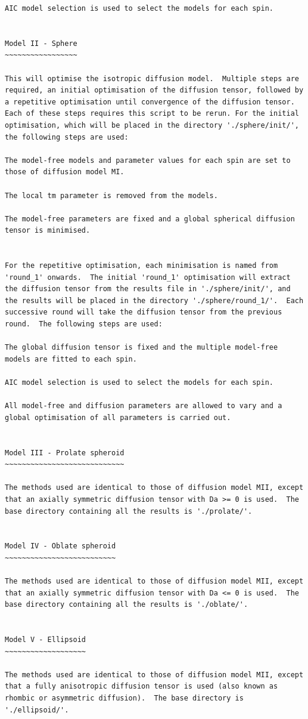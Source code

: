 \begin{lstlisting}
AIC model selection is used to select the models for each spin.


Model II - Sphere
~~~~~~~~~~~~~~~~~

This will optimise the isotropic diffusion model.  Multiple steps are required, an initial optimisation of the diffusion tensor, followed by a repetitive optimisation until convergence of the diffusion tensor.  Each of these steps requires this script to be rerun. For the initial optimisation, which will be placed in the directory './sphere/init/', the following steps are used:

The model-free models and parameter values for each spin are set to those of diffusion model MI.

The local tm parameter is removed from the models.

The model-free parameters are fixed and a global spherical diffusion tensor is minimised.


For the repetitive optimisation, each minimisation is named from 'round_1' onwards.  The initial 'round_1' optimisation will extract the diffusion tensor from the results file in './sphere/init/', and the results will be placed in the directory './sphere/round_1/'.  Each successive round will take the diffusion tensor from the previous round.  The following steps are used:

The global diffusion tensor is fixed and the multiple model-free models are fitted to each spin.

AIC model selection is used to select the models for each spin.

All model-free and diffusion parameters are allowed to vary and a global optimisation of all parameters is carried out.


Model III - Prolate spheroid
~~~~~~~~~~~~~~~~~~~~~~~~~~~~

The methods used are identical to those of diffusion model MII, except that an axially symmetric diffusion tensor with Da >= 0 is used.  The base directory containing all the results is './prolate/'.


Model IV - Oblate spheroid
~~~~~~~~~~~~~~~~~~~~~~~~~~

The methods used are identical to those of diffusion model MII, except that an axially symmetric diffusion tensor with Da <= 0 is used.  The base directory containing all the results is './oblate/'.


Model V - Ellipsoid
~~~~~~~~~~~~~~~~~~~

The methods used are identical to those of diffusion model MII, except that a fully anisotropic diffusion tensor is used (also known as rhombic or asymmetric diffusion).  The base directory is './ellipsoid/'.




\end{lstlisting}
